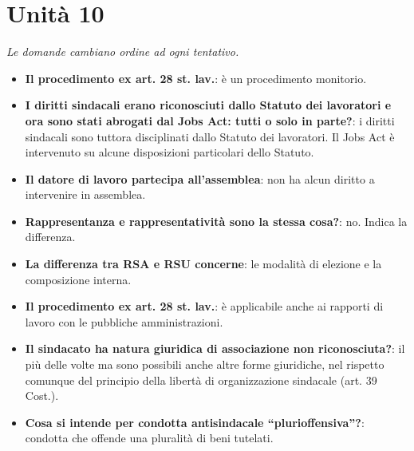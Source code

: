 \documentclass[12pt, a4paper]{report}
\begin{document}
\chapter{Unità 10}
    \textit{Le domande cambiano ordine ad ogni tentativo.}
    \begin{itemize}
        \item \textbf{Il procedimento ex art. 28 st. lav.}: è un procedimento monitorio.
        \item \textbf{I diritti sindacali erano riconosciuti dallo Statuto dei lavoratori e ora sono stati abrogati dal Jobs Act: tutti o solo in parte?}: i diritti sindacali sono tuttora disciplinati dallo Statuto dei lavoratori. Il Jobs Act è intervenuto su alcune disposizioni particolari dello Statuto.
        \item \textbf{Il datore di lavoro partecipa all’assemblea}: non ha alcun diritto a intervenire in assemblea.
        \item \textbf{Rappresentanza e rappresentatività sono la stessa cosa?}: no. Indica la differenza.
        \item \textbf{La differenza tra RSA e RSU concerne}: le modalità di elezione e la composizione interna.
        \item \textbf{Il procedimento ex art. 28 st. lav.}: è applicabile anche ai rapporti di lavoro con le pubbliche amministrazioni.
        \item \textbf{Il sindacato ha natura giuridica di associazione non riconosciuta?}: il più delle volte ma sono possibili anche altre forme giuridiche, nel rispetto comunque del principio della libertà di organizzazione sindacale (art. 39 Cost.).
        \item \textbf{Cosa si intende per condotta antisindacale “plurioffensiva”?}: condotta che offende una pluralità di beni tutelati.
    \end{itemize}
\end{document}
